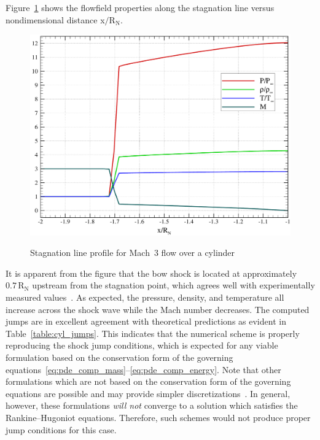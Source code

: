 Figure~\ref{fig:cyl_stagline} shows the flowfield properties along the stagnation line versus nondimensional distance x$/\text{R}_\text{N}$.  
\begin{figure}[hbtp]
  \begin{center}
    \includegraphics[width=\textwidth]{figures/mach3_cylinder/centerline} \\
    \caption{Stagnation line profile for Mach~3 flow over a cylinder\label{fig:cyl_stagline}}
  \end{center}
\end{figure}
It is apparent from the figure that the bow shock is located at approximately $0.7\,\text{R}_\text{N}$ upstream from the stagnation point, which agrees well with experimentally measured values~\cite{ambrosio_wortman}.  As expected, the pressure, density, and temperature all increase across the shock wave while the Mach number decreases.  The computed jumps are in excellent agreement with theoretical predictions as evident in Table~\ref{table:cyl_jumps}.
This indicates that the numerical scheme is properly reproducing the shock jump conditions, which is expected for any viable formulation based on the conservation form of the governing equations~\eqref{eq:pde_comp_mass}--\eqref{eq:pde_comp_energy}. Note that other formulations which are not based on the conservation form of the governing equations are possible and may provide simpler discretizations~\cite{pjcapon_dissertation}.  In general, however, these formulations \emph{will not} converge to a solution which satisfies the Rankine--Hugoniot equations.  Therefore, such schemes would not produce proper jump conditions for this case.
